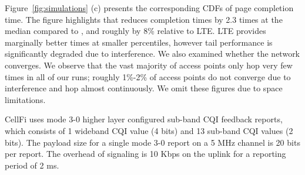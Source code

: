 Figure~\ref{fig:simulations} (c) presents the corresponding CDFs of page completion time. The figure
highlights that \cf reduces completion times by 2.3 times at the median compared to \wf, 
and roughly by 8\% relative to LTE. LTE provides marginally better times at smaller percentiles, however
tail performance is significantly degraded due to interference. We also examined whether the network converges. 
We observe that the vast majority of access points only hop very few times in all of our runs; roughly 
1\%-2\% of access points do not converge due to interference and hop almost continuously. 
We omit these figures due to space limitations.














CellFi uses mode 3-0 higher layer configured sub-band CQI feedback reports, which consists of 1 wideband CQI value (4 bits) and 13 sub-band CQI values (2 bits). 
The payload size for a single mode 3-0 report on a 5 MHz channel is 20 bits per report. 
The overhead of signaling is 10 Kbps on the uplink for a reporting period of 2 ms. 

